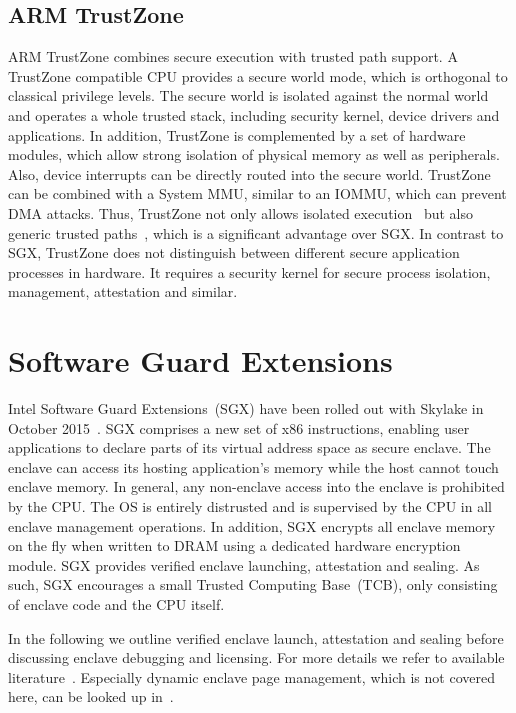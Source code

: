 \documentclass{sig-alternate-05-2015}
\begin{document}
\subsection{ARM TrustZone}
ARM TrustZone combines secure execution with trusted path support. 
A TrustZone compatible CPU provides a secure world mode, which is orthogonal to classical privilege levels. 
The secure world is isolated against the normal world and operates a whole trusted stack, including security kernel, device drivers and applications. 
In addition, TrustZone is complemented by a set of hardware modules, which allow strong isolation of physical memory as well as peripherals. 
Also, device interrupts can be directly routed into the secure world. 
TrustZone can be combined with a System MMU, similar to an IOMMU, which can prevent DMA attacks. 
Thus, TrustZone not only allows isolated execution~\cite{sun_trustice:_2015} but also generic trusted paths~\cite{li_building_2014}, which is a significant advantage over SGX. 
In contrast to SGX, TrustZone does not distinguish between different secure application processes in hardware. 
It requires a security kernel for secure process isolation, management, attestation and similar.  



\section{Software Guard Extensions}\label{sec:sgx}
Intel Software Guard Extensions~(SGX) have been rolled out with Skylake in October 2015~\cite{sgxshipping}. SGX comprises a new set of x86 instructions, enabling user applications to declare parts of its virtual address space as secure enclave. The enclave can access its hosting application's memory while the host cannot touch enclave memory. In general, any non-enclave access into the enclave is prohibited by the CPU. 
The OS is entirely distrusted and is supervised by the CPU in all enclave management operations. In addition, SGX encrypts all enclave memory on the fly when written to DRAM using a dedicated hardware encryption module. SGX provides verified enclave launching, attestation and sealing. As such, SGX encourages a small Trusted Computing Base~(TCB), only consisting of enclave code and the CPU itself. 

In the following we outline verified enclave launch, attestation and sealing before discussing enclave debugging and licensing. 
For more details we refer to available literature~\cite{sgxmanual,sgxsdm,sgxtutorial,costan_intel_2016,mckeen_innovative_2013,anati_innovative_2013,sgxsoftwaresolutions,sgxsdk,sgxdevguide}. Especially dynamic enclave page management, which is not covered here, can be looked up in~\cite{mckeen_innovative_2013,sgxmanual}.
\end{document}
